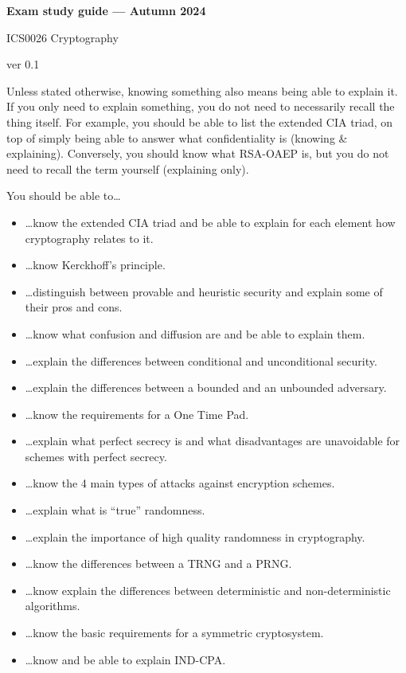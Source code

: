 \documentclass[usegeometry,parskip=half]{scrartcl}
\begin{document}
\begin{center}
  \textbf{Exam study guide --- Autumn 2024}

  ICS0026 Cryptography

  ver 0.1
\end{center}

Unless stated otherwise, knowing something also means being able to explain it.
If you only need to explain something, you do not need to necessarily recall the thing itself.
For example, you should be able to list the extended CIA triad, on top of simply being able to answer what confidentiality is (knowing \& explaining).
Conversely, you should know what RSA-OAEP is, but you do not need to recall the term yourself (explaining only).

You should be able to\dots{}
\begin{itemize}
  \item \dots{}know the extended CIA triad and be able to explain for each element how cryptography relates to it.
  \item \dots{}know Kerckhoff's principle.
  \item \dots{}distinguish between provable and heuristic security and explain some of their pros and cons.
  \item \dots{}know what confusion and diffusion are and be able to explain them.
  \item \dots{}explain the differences between conditional and unconditional security.
  \item \dots{}explain the differences between a bounded and an unbounded adversary.
  \item \dots{}know the requirements for a One Time Pad.
  \item \dots{}explain what perfect secrecy is and what disadvantages are unavoidable for schemes with perfect secrecy.
  \item \dots{}know the 4 main types of attacks against encryption schemes.
  \item \dots{}explain what is \enquote{true} randomness.
  \item \dots{}explain the importance of high quality randomness in cryptography.
  \item \dots{}know the differences between a TRNG and a PRNG.
  \item \dots{}know explain the differences between deterministic and non-deterministic algorithms.
  \item \dots{}know the basic requirements for a symmetric cryptosystem.
  \item \dots{}know and be able to explain IND-CPA.

\end{itemize}
\end{document}
